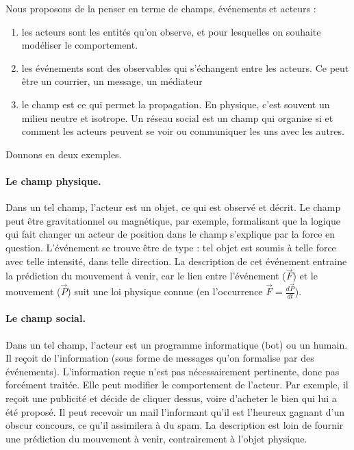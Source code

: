 \documentclass[11pt]{article}
\begin{document}
		
		Nous proposons de la penser en terme de champs, événements et acteurs : 
		\begin{enumerate}
			\item les acteurs sont les entités qu'on observe, et pour lesquelles on souhaite modéliser le comportement. 
			\item les événements sont des observables qui s'échangent entre les acteurs. Ce peut être un courrier, un message, un médiateur
			\item le champ est ce qui permet la propagation. En physique, c'est souvent un milieu neutre et isotrope. Un réseau social est un champ qui organise si et comment les acteurs peuvent se voir ou communiquer les uns avec les autres.
		\end{enumerate}
		
		Donnons en deux exemples. 
		\paragraph{Le champ physique. } Dans un tel champ, l'acteur est un objet, ce qui est observé et décrit. Le champ peut être gravitationnel ou magnétique, par exemple, formalisant que la logique qui fait changer un acteur de position dans le champ s'explique par la force en question. L'événement se trouve être de type : tel objet est soumis à telle force avec telle intensité, dans telle direction. La description de cet événement entraine la prédiction du mouvement à venir, car le lien entre l'événement ($\vec{F}$) et le mouvement ($\vec{P}$) suit une loi physique connue (en l'occurrence $\vec{F} = \frac{d\vec{P}}{dt}$). 
		
		\paragraph{Le champ social. } Dans un tel champ, l'acteur est un programme informatique (bot) ou un humain. Il reçoit de l'information (sous forme de messages qu'on formalise par des événements). L'information reçue n'est pas nécessairement pertinente, donc pas forcément traitée. Elle peut modifier le comportement de l'acteur. Par exemple, il reçoit une publicité et décide de cliquer dessus, voire d'acheter le bien qui lui a été proposé. Il peut recevoir un mail l'informant qu'il est l'heureux gagnant d'un obscur concours, ce qu'il assimilera à du spam. La description est loin de fournir une prédiction du mouvement à venir, contrairement à l'objet physique. 
		
\end{document}
